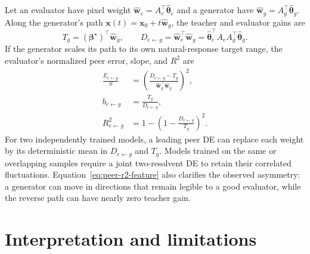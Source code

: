\documentclass[11pt]{article}
\newcommand{\bstar}{\bm\beta^{\star}}
\begin{document}
Let an evaluator have pixel weight
$\widehat{\bm w}_e=A_e^{\top}\widehat{\bm\theta}_e$ and a generator have
$\widehat{\bm w}_g=A_g^{\top}\widehat{\bm\theta}_g$.  Along the generator's
path $\bm x(t)=\bm x_0+t\widehat{\bm w}_g$, the teacher and evaluator gains
are
\begin{equation}
  T_g=(\bstar)^{\top}\widehat{\bm w}_g,\qquad
  D_{e\leftarrow g}=\widehat{\bm w}_e^{\top}\widehat{\bm w}_g
  =\widehat{\bm\theta}_e^{\top}A_eA_g^{\top}
       \widehat{\bm\theta}_g.
\end{equation}
If the generator scales its path to its own natural-response target range,
the evaluator's normalized peer error, slope, and $R^2$ are
\begin{align}
  \frac{E_{e\leftarrow g}}{S}
    &=\left(\frac{D_{e\leftarrow g}-T_g}
                    {\widehat{\bm w}_g^{\top}\widehat{\bm w}_g}\right)^2,\\
  b_{e\leftarrow g}&=\frac{T_g}{D_{e\leftarrow g}},\\
  R^2_{e\leftarrow g}
    &=1-\left(1-\frac{D_{e\leftarrow g}}{T_g}\right)^2.
  \label{eq:peer-r2-feature}
\end{align}
For two independently trained models, a leading peer DE can replace each
weight by its deterministic mean in $D_{e\leftarrow g}$ and $T_g$.  Models
trained on the same or overlapping samples require a joint two-resolvent DE
to retain their correlated fluctuations.  Equation~\eqref{eq:peer-r2-feature}
also clarifies the observed asymmetry: a generator can move in directions
that remain legible to a good evaluator, while the reverse path can have
nearly zero teacher gain.

\section{Interpretation and limitations}
\end{document}
